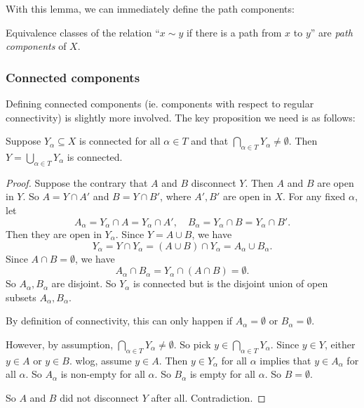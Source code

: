 \documentclass[a4paper]{article}
\begin{document}
With this lemma, we can immediately define the path components:
\begin{defi}
  Equivalence classes of the relation ``$x\sim y$ if there is a path from $x$ to $y$'' are \emph{path components} of $X$.
\end{defi}

\subsubsection{Connected components}
Defining connected components (ie. components with respect to regular connectivity) is slightly more involved. The key proposition we need is as follows:

\begin{prop}
  Suppose $Y_\alpha\subseteq X$ is connected for all $\alpha\in T$ and that $\bigcap_{\alpha\in T}Y_\alpha \not= \emptyset$. Then $Y = \bigcup_{\alpha\in T}Y_\alpha$ is connected.
\end{prop}

\begin{proof}
  Suppose the contrary that $A$ and $B$ disconnect $Y$. Then $A$ and $B$ are open in $Y$. So $A = Y\cap A'$ and $B = Y\cap B'$, where $A', B'$ are open in $X$. For any fixed $\alpha$, let
  \[
    A_\alpha = Y_\alpha \cap A = Y_\alpha \cap A',\quad B_\alpha = Y_\alpha\cap B = Y_\alpha \cap B'.
  \]
  Then they are open in $Y_\alpha$. Since $Y = A\cup B$, we have
  \[
    Y_\alpha = Y\cap Y_\alpha = (A\cup B)\cap Y_\alpha = A_\alpha \cup B_\alpha.
  \]
  Since $A\cap B = \emptyset$, we have
  \[
    A_\alpha \cap B_\alpha =  Y_\alpha \cap (A\cap B) = \emptyset.
  \]
  So $A_\alpha, B_\alpha$ are disjoint. So $Y_\alpha$ is connected but is the disjoint union of open subsets $A_\alpha, B_\alpha$.

  By definition of connectivity, this can only happen if $A_\alpha = \emptyset$ or $B_\alpha = \emptyset$.

  However, by assumption, $\displaystyle\bigcap_{\alpha \in T}Y_\alpha \not= \emptyset$. So pick $\displaystyle y\in \bigcap_{\alpha\in T}Y_\alpha$. Since $y\in Y$, either $y\in A$ or $y\in B$. wlog, assume $y\in A$. Then $y\in Y_\alpha$ for all $\alpha$ implies that $y\in A_\alpha$ for all $\alpha$. So $A_\alpha$ is non-empty for all $\alpha$. So $B_\alpha$ is empty for all $\alpha$. So $B = \emptyset$.

  So $A$ and $B$ did not disconnect $Y$ after all. Contradiction.
\end{proof}
\end{document}
